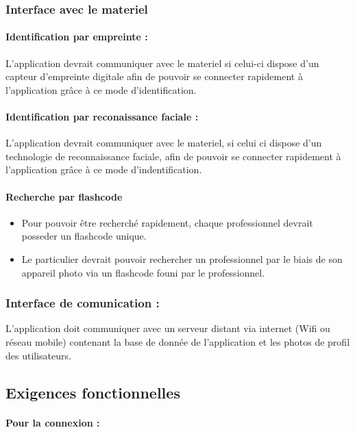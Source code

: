 \documentclass{article}
\begin{document}
\begin{itemize}
\begin{itemize}
\subsubsection{Interface avec le materiel}
\paragraph{Identification par empreinte :}
L'application devrait communiquer avec le materiel si celui-ci dispose
d'un capteur d'empreinte digitale afin de pouvoir se connecter rapidement à
l'application grâce à ce mode d'identification.
\paragraph{Identification par reconaissance faciale :}
L'application devrait communiquer avec le materiel, si celui ci dispose
d'un technologie de reconnaissance faciale, afin de pouvoir se
connecter rapidement à l'application grâce à ce mode
d'indentification.
\paragraph{Recherche par flashcode}
\begin{itemize}
\item Pour pouvoir être recherché rapidement, chaque professionnel
  devrait posseder un flashcode unique.
\item Le particulier devrait pouvoir rechercher un professionnel par le
  biais de son appareil photo via un flashcode founi par le
  professionnel.
\end{itemize}

\subsubsection{Interface de comunication :}
L'application doit communiquer avec un serveur distant via internet
(Wifi ou réseau mobile) contenant la base de donnée de l'application et
les photos de profil des utilisateurs.


\subsection{Exigences fonctionnelles}
\paragraph{Pour la connexion : }


\end{itemize}
\end{itemize}
\end{document}
